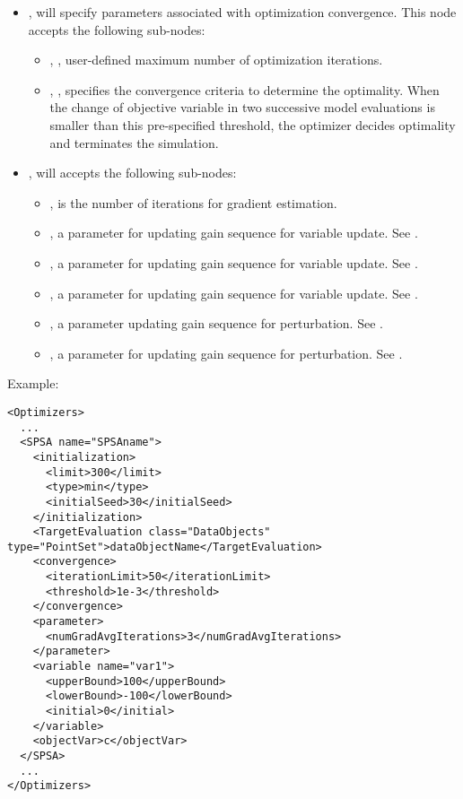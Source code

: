 \begin{itemize}
\item {},  will specify parameters associated with optimization convergence. This node accepts the following sub-nodes:
  \begin{itemize}
  \item {}, , user-defined maximum number of optimization iterations.
  \item {}, , specifies the convergence criteria to determine the optimality. When the change of objective variable in two successive model evaluations is smaller than this pre-specified threshold, the  optimizer decides optimality and terminates the simulation.
  \end{itemize}
\item {},  will accepts the following sub-nodes:
  \begin{itemize}
  \item {},  is the number of iterations for gradient estimation.
  \item {},  a parameter for updating gain sequence for variable update. See \cite{spall1998implementation}.
  \item {},  a parameter for updating gain sequence for variable update. See \cite{spall1998implementation}.
  \item {},  a parameter for updating gain sequence for variable update. See \cite{spall1998implementation}.
  \item {},  a parameter updating gain sequence for perturbation. See \cite{spall1998implementation}.
  \item {},  a parameter for updating gain sequence for perturbation. See \cite{spall1998implementation}.
  \end{itemize}
\end{itemize}


Example:
\begin{lstlisting}[style=XML]
<Optimizers>
  ...
  <SPSA name="SPSAname">
    <initialization>
      <limit>300</limit>
      <type>min</type>
      <initialSeed>30</initialSeed>
    </initialization>
    <TargetEvaluation class="DataObjects" type="PointSet">dataObjectName</TargetEvaluation>
    <convergence>
      <iterationLimit>50</iterationLimit>
      <threshold>1e-3</threshold>
    </convergence>
    <parameter>
      <numGradAvgIterations>3</numGradAvgIterations>
    </parameter>
    <variable name="var1">
      <upperBound>100</upperBound>
      <lowerBound>-100</lowerBound>
      <initial>0</initial>
    </variable>
    <objectVar>c</objectVar>
  </SPSA>
  ...
</Optimizers>
\end{lstlisting}
